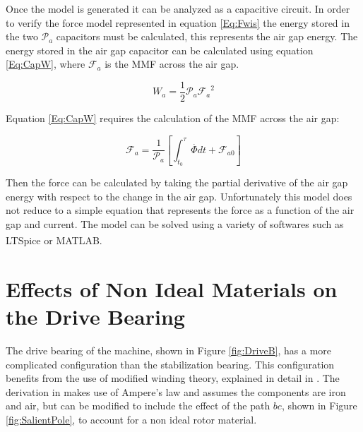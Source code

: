 Once the model is generated it can be analyzed as a capacitive circuit. In order to verify the force model represented in equation \ref{Eq:Fwis} the energy stored in the two $\mathcal{P}_{a}$ capacitors must be calculated, this represents the air gap energy. The energy stored in the air gap capacitor can be calculated using equation \ref{Eq:CapW}, where $\mathcal{F}_{a}$ is the MMF across the air gap.

\begin{equation}\label{Eq:CapW}
	W_{a}=\frac{1}{2}\mathcal{P}_{a}{\mathcal{F}_{a}}^{2}
\end{equation}

Equation \ref{Eq:CapW} requires the calculation of the MMF across the air gap:

\begin{equation}\label{Eq:CapV}
	\mathcal{F}_{a}=\frac{1}{\mathcal{P}_{a}}\left[{\int}_{{t}_{0}}^{\tau }\stackrel{.}{\Phi}dt+\mathcal{F}_{a0}\right]
\end{equation}

Then the force can be calculated by taking the partial derivative of the air gap energy with respect to the change in the air gap. Unfortunately this model does not reduce to a simple equation that represents the force as a function of the air gap and current. The model can be solved using a variety of softwares such as LTSpice\textsuperscript{\textregistered} or MATLAB\textsuperscript{\textregistered}. 




\section{Effects of Non Ideal Materials on the Drive Bearing}

The drive bearing of the machine, shown in Figure \ref{fig:DriveB}, has a more complicated configuration than the stabilization bearing. This configuration benefits from the use of modified winding theory, explained in detail in \cite{Wimer}. The derivation in \cite{Wimer} makes use of Ampere's law and assumes the components are iron and air, but can be modified to include the effect of the path $bc$, shown in Figure \ref{fig:SalientPole}, to account for a non ideal rotor material. 

